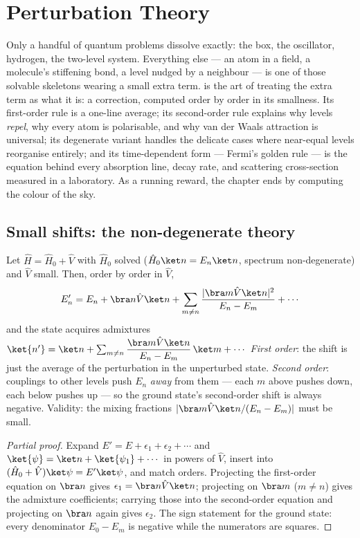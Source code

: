 \chapter{Perturbation Theory}\label{ch:b3:perturbation-theory}

Only a handful of quantum problems dissolve exactly: the box, the
oscillator, hydrogen, the two-level system. Everything else --- an
atom in a field, a molecule's stiffening bond, a level nudged by a
neighbour --- is one of those solvable skeletons wearing a small
extra term.  is the art of treating the extra
term as what it is: a correction, computed order by order in its
smallness. Its first-order rule is a one-line average; its
second-order rule explains why levels \emph{repel}, why every atom is
polarisable, and why van der Waals attraction is universal; its
degenerate variant handles the delicate cases where near-equal
levels reorganise entirely; and its time-dependent form --- Fermi's
golden rule --- is the equation behind every absorption line, decay
rate, and scattering cross-section measured in a laboratory. As a
running reward, the chapter ends by computing the colour of the sky.

\section{Small shifts: the non-degenerate theory}

\begin{theorem}\label{thm:b3:perturbation-theory:corrections}
Let $\hat H = \hat H_0 + \hat V$ with $\hat H_0$ solved
($\hat H_0\ket n = E_n\ket n$, spectrum non-degenerate) and $\hat V$
small. Then, order by order in $\hat V$,
\[
E_n' = E_n + \bra n\hat V\ket n
 + \sum_{m \neq n}\frac{|\bra m\hat V\ket n|^2}{E_n - E_m}
 + \cdots
\]
and the state acquires admixtures $\ket{n'} = \ket n + \sum_{m\neq
n}\dfrac{\bra m\hat V\ket n}{E_n - E_m}\,\ket m + \cdots$
\emph{First order}: the shift is just the average of the
perturbation in the unperturbed state. \emph{Second order}:
couplings to other levels push $E_n$ \emph{away} from them ---
each $m$ above pushes down, each below pushes up --- so the ground
state's second-order shift is always negative. Validity: the mixing
fractions $|\bra m\hat V\ket n/(E_n - E_m)|$ must be small.
\end{theorem}

\begin{proof}[Partial proof]
Expand $E' = E + \epsilon_1 + \epsilon_2 + \cdots$ and $\ket{\psi} =
\ket n + \ket{\psi_1} + \cdots$ in powers of $\hat V$, insert into
$(\hat H_0 + \hat V)\ket\psi = E'\ket\psi$, and match orders.
Projecting the first-order equation on $\bra n$ gives $\epsilon_1 =
\bra n\hat V\ket n$; projecting on $\bra m$ ($m \neq n$) gives the
admixture coefficients; carrying those into the second-order
equation and projecting on $\bra n$ again gives $\epsilon_2$. The
sign statement for the ground state: every denominator $E_0 - E_m$
is negative while the numerators are squares.
\end{proof}


